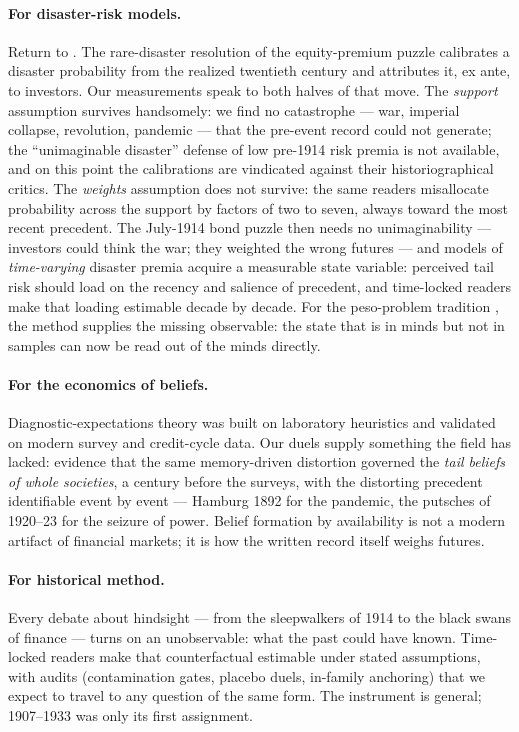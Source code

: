 \documentclass[11pt]{article}
\begin{document}
\paragraph{For disaster-risk models.} Return to \citet{barro2006}. The rare-disaster resolution of the
equity-premium puzzle calibrates a disaster probability from the realized twentieth century and attributes
it, ex ante, to investors. Our measurements speak to both halves of that move. The \emph{support} assumption
survives handsomely: we find no catastrophe --- war, imperial collapse, revolution, pandemic --- that the
pre-event record could not generate; the ``unimaginable disaster'' defense of low pre-1914 risk premia is
not available, and on this point the calibrations are vindicated against their historiographical critics.
The \emph{weights} assumption does not survive: the same readers misallocate probability across the support
by factors of two to seven, always toward the most recent precedent. The July-1914 bond puzzle
\citep{ferguson2006} then needs no unimaginability --- investors could think the war; they weighted the
wrong futures --- and models of \emph{time-varying} disaster premia \citep{gabaix2012,wachter2013} acquire a
measurable state variable: perceived tail risk should load on the recency and salience of precedent, and
time-locked readers make that loading estimable decade by decade. For the peso-problem tradition
\citep{krasker1980}, the method supplies the missing observable: the state that is in minds but not in
samples can now be read out of the minds directly.

\paragraph{For the economics of beliefs.} Diagnostic-expectations theory \citep{bordalo2018,gennaioli2018}
was built on laboratory heuristics \citep{tversky1973} and validated on modern survey and credit-cycle data.
Our duels supply something the field has lacked: evidence that the same memory-driven distortion governed
the \emph{tail beliefs of whole societies}, a century before the surveys, with the distorting precedent
identifiable event by event --- Hamburg 1892 for the pandemic, the putsches of 1920--23 for the seizure of
power. Belief formation by availability is not a modern artifact of financial markets; it is how the written
record itself weighs futures.

\paragraph{For historical method.} Every debate about hindsight --- from the sleepwalkers of 1914 to the
black swans of finance \citep{taleb2007,tetlock2005,kuran1991} --- turns on an unobservable: what the past
could have known. Time-locked readers make that counterfactual estimable under stated assumptions, with
audits (contamination gates, placebo duels, in-family anchoring) that we expect to travel to any question of
the same form. The instrument is general; 1907--1933 was only its first assignment.
\end{document}
